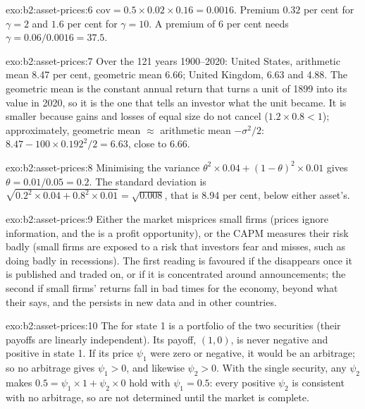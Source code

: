 \begin{solution}{exo:b2:asset-prices:6}
$\mathrm{cov} = 0.5 \times 0.02 \times 0.16 = 0.0016$. Premium $0.32$ per cent for $\gamma = 2$ and
$1.6$ per cent for $\gamma = 10$. A premium of 6 per cent needs $\gamma = 0.06/0.0016 = 37.5$.
\end{solution}

\begin{solution}{exo:b2:asset-prices:7}
Over the 121 years 1900--2020: United States, arithmetic mean 8.47 per cent, geometric mean 6.66; United
Kingdom, 6.63 and 4.88. The geometric mean is the constant annual return that turns a unit of 1899 into
its value in 2020, so it is the one that tells an investor what the unit became. It is smaller because
gains and losses of equal size do not cancel ($1.2 \times 0.8 < 1$); approximately, geometric mean
$\approx$ arithmetic mean $- \sigma^2/2$: $8.47 - 100 \times 0.192^2/2 = 6.63$, close to 6.66.
\end{solution}

\begin{solution}{exo:b2:asset-prices:8}
Minimising the variance $\theta^2 \times 0.04 + (1 - \theta)^2 \times 0.01$ gives $\theta =
0.01/0.05 = 0.2$. The standard deviation is $\sqrt{0.2^2 \times 0.04 + 0.8^2 \times 0.01} =
\sqrt{0.008}$, that is 8.94 per cent, below either asset's.
\end{solution}

\begin{solution}{exo:b2:asset-prices:9}
Either the market misprices small firms (prices ignore information, and the  is a
profit opportunity), or the CAPM measures their risk badly (small firms are exposed to a risk that
investors fear and  misses, such as doing badly in recessions). The first reading is favoured if
the  disappears once it is published and traded on, or if it is concentrated around
announcements; the second if small firms' returns fall in bad times for the economy, beyond what their
 says, and the  persists in new data and in other countries.
\end{solution}

\begin{solution}{exo:b2:asset-prices:10}
The  for state 1 is a portfolio of the two securities (their payoffs are linearly
independent). Its payoff, $(1, 0)$, is never negative and positive in state 1. If its price $\psi_1$
were zero or negative, it would be an arbitrage; so no arbitrage gives $\psi_1 > 0$, and likewise
$\psi_2 > 0$. With the single security, any $\psi_2$ makes $0.5 = \psi_1 \times 1 + \psi_2 \times 0$
hold with $\psi_1 = 0.5$: every positive $\psi_2$ is consistent with no arbitrage, so  are
not determined until the market is complete.
\end{solution}

